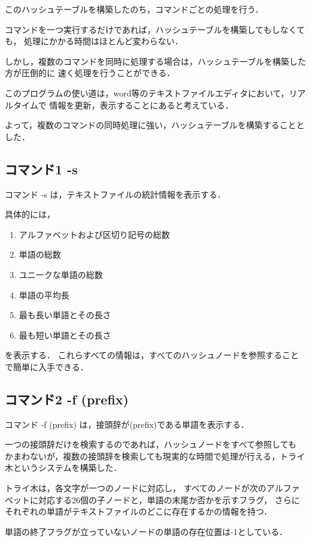 \documentclass{jsarticle}
\begin{document}
    このハッシュテーブルを構築したのち，コマンドごとの処理を行う．

    コマンドを一つ実行するだけであれば，ハッシュテーブルを構築してもしなくても，
    処理にかかる時間はほとんど変わらない．

    しかし，複数のコマンドを同時に処理する場合は，ハッシュテーブルを構築した方が圧倒的に
    速く処理を行うことができる．

    このプログラムの使い道は，word等のテキストファイルエディタにおいて，リアルタイムで
    情報を更新，表示することにあると考えている．

    よって，複数のコマンドの同時処理に強い，ハッシュテーブルを構築することとした．


    \subsection{コマンド1 -s}
    コマンド -s は，テキストファイルの統計情報を表示する．
    
    具体的には，
      \begin{enumerate}
        \item アルファベットおよび区切り記号の総数
        \item 単語の総数
        \item ユニークな単語の総数
        \item 単語の平均長
        \item 最も長い単語とその長さ
        \item 最も短い単語とその長さ
      \end{enumerate}
    を表示する．
    これらすべての情報は，すべてのハッシュノードを参照することで簡単に入手できる．

    \subsection{コマンド2 -f (prefix)}
    コマンド -f (prefix) は，接頭辞が(prefix)である単語を表示する．
    
    一つの接頭辞だけを検索するのであれば，ハッシュノードをすべて参照しても
    かまわないが，複数の接頭辞を検索しても現実的な時間で処理が行える，トライ木というシステムを構築した．

    トライ木は，各文字が一つのノードに対応し，
    すべてのノードが次のアルファベットに対応する26個の子ノードと，単語の末尾か否かを示すフラグ，
    さらにそれぞれの単語がテキストファイルのどこに存在するかの情報を持つ．

    単語の終了フラグが立っていないノードの単語の存在位置は-1としている．
    
\end{document}
